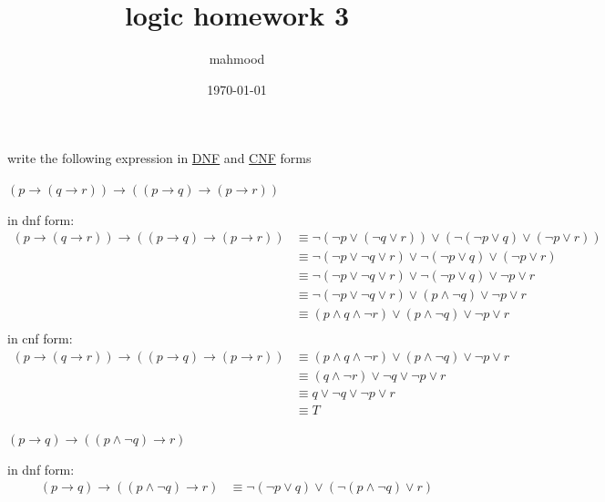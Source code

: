 \documentclass[a4paper,12pt]{article}
\author{mahmood}
\date{\today}
\title{logic homework 3}
\begin{document}
\maketitle
\begin{question}
write the following expression in \href{20230422185928-dnf.org}{DNF} and \href{20230422185859-cnf.org}{CNF} forms\\
\begin{subquestion}
\((p \rightarrow (q \rightarrow r)) \rightarrow ((p \rightarrow q) \rightarrow (p \rightarrow r))\)\\
\begin{answer}
in dnf form:\\
\begin{align*}
  (p \rightarrow (q \rightarrow r)) \rightarrow ((p \rightarrow q) \rightarrow (p \rightarrow r)) &\equiv \lnot(\lnot p \lor (\lnot q \lor r)) \lor (\lnot(\lnot p \lor q) \lor (\lnot p \lor r))\\
  &\equiv \lnot(\lnot p \lor \lnot q \lor r) \lor \lnot(\lnot p \lor q) \lor (\lnot p \lor r)\\
  &\equiv \lnot(\lnot p \lor \lnot q \lor r) \lor \lnot(\lnot p \lor q) \lor \lnot p \lor r\\
  &\equiv \lnot(\lnot p \lor \lnot q \lor r) \lor (p \land \lnot q) \lor \lnot p \lor r\\
  &\equiv (p \land q \land \lnot r) \lor (p \land \lnot q) \lor \lnot p \lor r\\
\end{align*}
in cnf form:\\
\begin{align*}
  (p \rightarrow (q \rightarrow r)) \rightarrow ((p \rightarrow q) \rightarrow (p \rightarrow r)) &\equiv (p \land q \land \lnot r) \lor (p \land \lnot q) \lor \lnot p \lor r\\
  &\equiv (q \land \lnot r) \lor \lnot q \lor \lnot p \lor r\\
  &\equiv q \lor \lnot q \lor \lnot p \lor r\\
  &\equiv T
\end{align*}
\end{answer}
\end{subquestion}
\begin{subquestion}
\((p \rightarrow q) \rightarrow ((p \land \lnot q) \rightarrow r)\)\\
\begin{answer}
in dnf form:\\
\begin{align*}
  (p \rightarrow q) \rightarrow ((p \land \lnot q) \rightarrow r) &\equiv \lnot(\lnot p \lor q) \lor (\lnot(p \land \lnot q) \lor r)\\

\end{align*}
\end{answer}
\end{subquestion}
\end{question}
\end{document}
